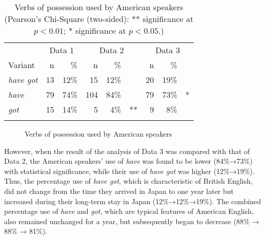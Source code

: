 \documentclass[output=paper,colorlinks,citecolor=brown]{langscibook}
\begin{document}
\begin{table}
\begin{tabular}{l rr rr@{}l rr@{}l}
\lsptoprule
  & \multicolumn{2}{c}{Data 1} & \multicolumn{3}{c}{Data 2} & \multicolumn{3}{c}{Data 3}\\\cmidrule(lr){2-3}\cmidrule(lr){4-6}\cmidrule(lr){7-9}
Variant           &  n  &  \%   &  n   &  \%   &    &   n &  \%   & \\\midrule
\textit{have got} &  13 &  12\% &  15  &  12\% &    &  20 &  19\% & \\
\textit{have}     &  79 &  74\% &  104 &  84\% &    &  79 &  73\% & *\\
\textit{got}      &  15 &  14\% &  5   &  4\%  & ** &  9  &  8\%  & \\
\lspbottomrule
\end{tabular}
\caption{Verbs of possession used by American speakers (Pearson’s Chi-Square (two-sided): ** significance at $p < 0.01$; * significance at $p < 0.05$.)}
\label{tab:hirano:5}
\end{table}

\begin{figure}
\caption{Verbs of possession used by American speakers}
\label{fig:hirano:3}
\end{figure}

However, when the result of the analysis of Data 3 was compared with that of Data 2, the American speakers’ use of \textit{have} was found to be lower (84\%→73\%) with statistical significance, while their use of \textit{have got} was higher (12\%→19\%). Thus, the percentage use of \textit{have got}, which is characteristic of British English, did not change from the time they arrived in Japan to one year later but increased during their long\hyp term stay in Japan (12\%→12\%→19\%). The combined percentage use of \textit{have} and \textit{got}, which are typical features of American English, also remained unchanged for a year, but subsequently began to decrease (88\% → 88\% → 81\%).
\end{document}
